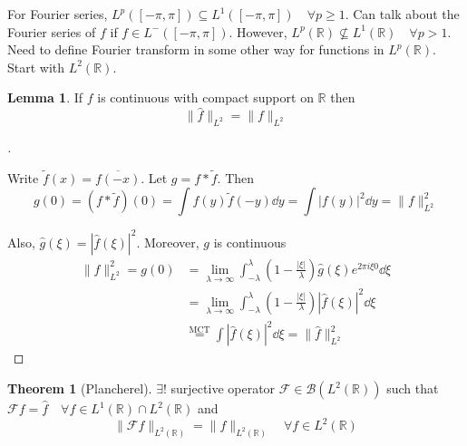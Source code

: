 \documentclass{article}
\theoremstyle{definition}
\newtheorem{thm}{Theorem}
\newtheorem{lem}{Lemma}
\newenvironment{proofs}[1][\proofname]{%
  \begin{proof}[#1]$ $\par\nobreak\ignorespaces
}{%
  \end{proof}
}
\newcommand{\B}{\mathcal B}
\newcommand{\F}{\mathcal F}
\newcommand{\RR}{\mathbb R}
\begin{document}
For Fourier series, $L^p([-\pi, \pi]) \subseteq L^1([-\pi, \pi]) \quad \forall p \geq 1$.
Can talk about the Fourier series of $f$ if $f \in L^-([-\pi, \pi])$.
However, $L^p(\RR) \not\subseteq L^1(\RR) \quad \forall p > 1$.
Need to define Fourier transform in some other way for functions in $L^p(\RR)$.
Start with $L^2(\RR)$.

\begin{lem}
	If $f$ is continuous with compact support on $\RR$ then
	\[
		\|\widehat{f}\|_{L^2} = \|f\|_{L^2}
	\]
\end{lem}

\begin{proofs}
	Write $\tilde{f}(x) = \overline{f(-x)}$.
	Let $g = f * \tilde{f}$.
	Then 
	\[
		g(0) = (f * \tilde{f})(0) = \int f(y) \tilde{f}(-y) \dd{y} = \int |f(y)|^2 \dd{y} = \|f\|_{L^2}^2
	\]

	Also, $\widehat{g}(\xi) = |\widehat{f}(\xi)|^2$.
	Moreover, $g$ is continuous
	\[
		\begin{split}
			\|f\|_{L^2}^2 = g(0) &= \lim_{\lambda \to \infty} \int_{-\lambda}^\lambda \left( 1 - \frac{|\xi|}{\lambda} \right) \widehat{g}(\xi) e^{2 \pi i \xi 0} \dd{\xi}\\
			&= \lim_{\lambda \to \infty} \int_{-\lambda}^\lambda \left(1 - \frac{|\xi|}{\lambda} \right) |\widehat{f}(\xi)|^2 \dd{\xi}\\
			&\stackrel{\text{MCT}} = \int |\widehat{f}(\xi)|^2 \dd{\xi} = \|\widehat{f}\|_{L^2}^2
		\end{split}
	\]
\end{proofs}

\begin{thm}[Plancherel]
	$\exists !$ surjective operator $\F \in \B(L^2(\RR))$ such that $\F f = \hat{f} \quad \forall f \in L^1(\RR) \cap L^2(\RR)$ and 
	\[
		\| \F f\|_{L^2(\RR)} = \|f\|_{L^2(\RR)} \quad \forall f \in L^2(\RR)
	\]
\end{thm}
\end{document}
